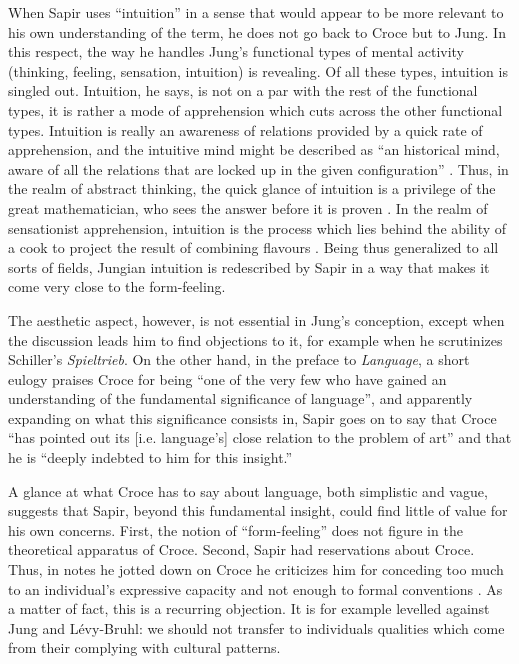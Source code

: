 \documentclass[output=paper]{langscibook}
\begin{document}
When Sapir uses ``intuition'' in a sense that would appear to be more relevant to his own understanding of the term, he does not go back to Croce but to Jung. In this respect, the way he handles Jung's functional types of mental activity (thinking, feeling, sensation, intuition) is revealing. Of all these types, intuition is singled out. Intuition, he says, is not on a par with the rest of the functional types, it is rather a mode of apprehension which cuts across the other functional types. Intuition is really an awareness of relations provided by a quick rate of apprehension, and the intuitive mind might be described as ``an historical mind, aware of all the relations that are locked up in the given configuration'' \citep[167]{Sapir2002}. Thus, in the realm of abstract thinking, the quick glance of intuition is a privilege of the great mathematician, who sees the answer before it is proven \citep[167]{Sapir2002}. In the realm of sensationist apprehension, intuition is the process which lies behind the ability of a cook to project the result of combining flavours \citep[168]{Sapir2002}. Being thus generalized to all sorts of fields, Jungian intuition is redescribed by Sapir in a way that makes it come very close to the form-feeling.

The aesthetic aspect, however, is not essential in Jung's conception, except when the discussion leads him to find objections to it, for example when he scrutinizes Schiller's \emph{Spieltrieb}. On the other hand, in the preface to \emph{Language}, a short eulogy praises Croce for being ``one of the very few who have gained an understanding of the fundamental significance of language'', and apparently expanding on what this significance consists in, Sapir goes on to say that Croce ``has pointed out its [i.e. language's] close relation to the problem of art'' and that he is ``deeply indebted to him for this insight.''

A glance at what Croce has to say about language, both simplistic and vague, suggests that Sapir, beyond this fundamental insight, could find little of value for his own concerns. First, the notion of ``form-feeling'' does not figure in the theoretical apparatus of Croce. Second, Sapir had reservations about Croce. Thus, in notes he jotted down on Croce he criticizes him for conceding too much to an individual's expressive capacity and not enough to formal conventions \citep{Handler1986}. As a matter of fact, this is a recurring objection. It is for example levelled against Jung and Lévy-Bruhl: we should not transfer to individuals qualities which come from their complying with cultural patterns.
\end{document}
